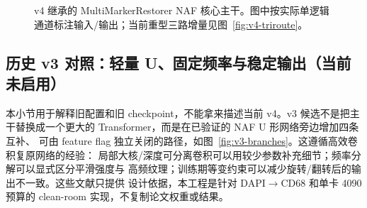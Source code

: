 \documentclass[12pt,a4paper,UTF8]{ctexart}
\begin{document}
\begin{figure}[H]
{}
\caption{v4 继承的 MultiMarkerRestorer NAF 核心主干。图中按实际单逻辑通道标注输入/输出；当前重型三路增量见图~\ref{fig:v4-triroute}。}
\label{fig:model-overview}
\end{figure}

\subsection{历史 v3 对照：轻量 U、固定频率与稳定输出（当前未启用）}

本小节用于解释旧配置和旧 checkpoint，不能拿来描述当前 v4。v3 候选不是把主干替换成一个更大的 Transformer，而是在已验证的 NAF U 形网络旁边增加四条互补、
可由 feature flag 独立关闭的路径，如图~\ref{fig:v3-branches}。这遵循高效卷积复原网络的经验：
局部大核/深度可分离卷积可以用较少参数补充细节\cite{convir,oknet}；频率分解可以显式区分平滑强度与
高频纹理\cite{adair}；训练期等变约束可以减少旋转/翻转后的输出不一致\cite{eqreg}。这些文献只提供
设计依据，本工程是针对 DAPI$\rightarrow$CD68 和单卡 4090 预算的 clean-room 实现，不复制论文权重或结果。
\end{document}
